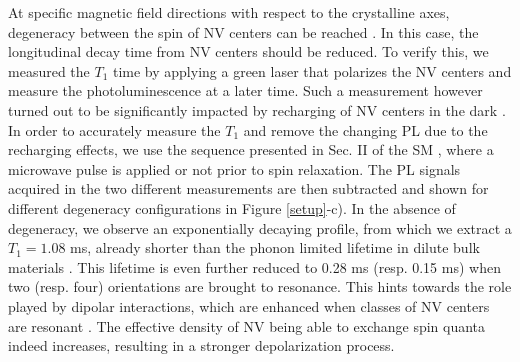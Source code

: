 \documentclass[preprintnumbers,amsmath,amssymb,superscriptaddress,twocolumn,showpacs]{revtex4-1}
\begin{document}
At specific magnetic field directions with respect to the crystalline axes, degeneracy between the spin of NV centers can be reached \cite{van_oort_cross-relaxation_1989}. %
In this case, the longitudinal decay time from NV centers should be reduced. To verify this, we measured the $T_1$ time by applying a green laser that polarizes the NV centers and measure the photoluminescence at a later time.
Such a measurement however turned out to be significantly impacted by recharging of NV centers in the dark \cite{choi_depolarization_2017, mrozek_longitudinal_2015, giri_selective_2019, giri_coupled_2018}.
In order to accurately measure the $T_1$ and remove the changing PL due to the recharging effects, we use the sequence presented in Sec. II of the SM \cite{SM_CR_meca}, where a microwave pulse is applied or not prior to spin relaxation. The PL signals acquired in the two different measurements are then subtracted and shown for different degeneracy configurations in Figure \ref{setup}-c).
In the absence of degeneracy, we observe an exponentially decaying profile, from which we extract a $T_1=1.08$ ms, already shorter than the phonon limited lifetime in dilute bulk materials \cite{Tetienne}. This lifetime is even further reduced to 0.28 ms (resp. 0.15 ms) when two (resp. four) orientations are brought to resonance. This hints towards the role played by dipolar interactions, which are enhanced when classes of NV centers are resonant \cite{van_oort_cross-relaxation_1989, choi_depolarization_2017}. The effective density of NV being able to exchange spin quanta indeed increases, resulting in a stronger depolarization process.

\end{document}
